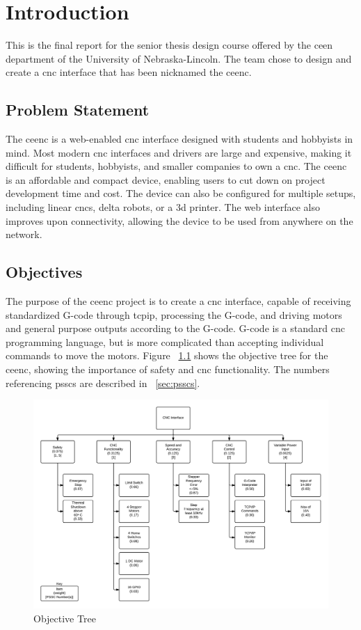 \chapter{Introduction}
This is the final report for the senior thesis design course offered by the \gls{ceen} department of the University of Nebraska-Lincoln.
The team chose to design and create a \gls{cnc} interface that has been nicknamed the \gls{ceenc}.

\section{Problem Statement}
The \gls{ceenc} is a web-enabled \gls{cnc} interface designed with students and hobbyists in mind.
Most modern \gls{cnc} interfaces and drivers are large and expensive, making it difficult for students, hobbyists, and smaller companies to own a \gls{cnc}.
The \gls{ceenc} is an affordable and compact device, enabling users to cut down on project development time and cost.
The device can also be configured for multiple setups, including linear \gls{cnc}s, delta robots, or a \gls{3d} printer.
The web interface also improves upon connectivity, allowing the device to be used from anywhere on the network.

\section{Objectives}
The purpose of the \gls{ceenc} project is to create a \gls{cnc} interface, capable of receiving standardized G-code through	 \gls{tcpip}, processing the G-code, and driving motors and general purpose outputs according to the G-code.
G-code is a standard \gls{cnc} programming language, but is more complicated than accepting individual commands to move the motors.
Figure ~\ref{fig:o-tree} shows the objective tree for the \gls{ceenc}, showing the importance of safety and \gls{cnc} functionality.
The numbers referencing \gls{pssc}s are described in ~\ref{sec:psscs}.

\begin{figure}[h]
	\centering
	\includegraphics[width=1\textwidth]{objective-tree.png}
	\caption{Objective Tree}
	\label{fig:o-tree}
\end{figure}

